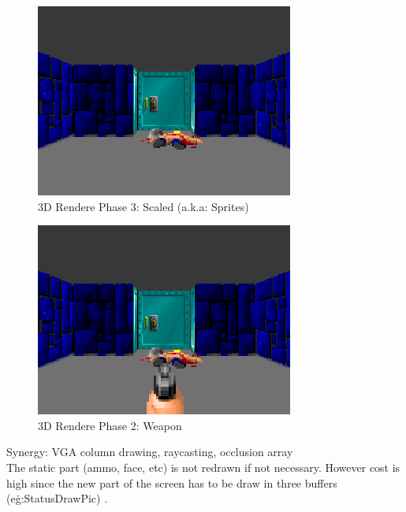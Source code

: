  
 \begin{figure}[H]
\centering
 \includegraphics[width=\textwidth]{screenshots/wolf3d_6_scaled}
 \caption{3D Rendere Phase 3: Scaled (a.k.a: Sprites)} 
 \end{figure}

 \begin{figure}[H]
\centering
 \includegraphics[width=\textwidth]{screenshots/wolf3d_7_fullframe.png}
 \caption{3D Rendere Phase 2: Weapon} 
 \end{figure}
 

   Synergy: VGA column drawing, raycasting, occlusion array\\


The static part (ammo, face, etc) is not redrawn if not necessary. However cost is high since the new part of the screen has to be draw in three buffers (e\.g:StatusDrawPic) .










